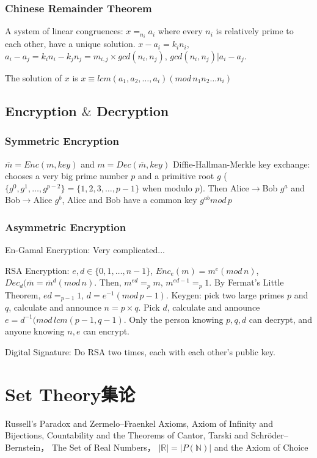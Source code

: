 \documentclass[12pt,a4paper]{ctexrep}
\begin{document}
\subsection{Chinese Remainder Theorem}
A system of linear congruences: $x =_{n_i} a_i$ where every $n_i$ is relatively prime to each other, have a unique solution. $x-a_i = k_i n_i$, $a_i-a_j = k_in_i-k_jn_j = m_{i,j} \times gcd(n_i,n_j)$, $gcd(n_i,n_j)|a_i-a_j$. 

The solution of $x$ is $x\equiv lcm(a_1,a_2,\dots,a_i) (mod\, n_1n_2\dots n_i)$

\section{Encryption $\&$ Decryption}
\subsection{Symmetric Encryption}
$\overline{m} = Enc(m,key)$ and $m = Dec(\overline{m},key)$
Diffie-Hallman-Merkle key exchange: chooses a very big prime number $p$ and a primitive root $g$ ($\{g^0,g^1,\dots, g^{p-2}\} = \{1,2,3,\dots, p-1\}$ when modulo $p$). Then Alice$\rightarrow$Bob $g^a$ and Bob$\rightarrow$Alice $g^b$, Alice and Bob have a common key $g^{ab} mod\, p$

\subsection{Asymmetric Encryption}
En-Gamal Encryption: Very complicated...%

RSA Encryption:
$e,d \in \{0,1,\dots,n-1\}$, $Enc_e(m) = m^e (mod\, n)$, $Dec_d(\overline{m} = \overline{m}^d (mod\, n)$. Then, $m^{ed} =_p m$, $m^{ed-1} =_p 1$. By Fermat's Little Theorem, $ed =_{p-1} 1$, $d = e^{-1} (mod\, p-1)$. Keygen: pick two large primes $p$ and $q$, calculate and announce $n = p \times q$. Pick $d$, calculate and announce $e = d^{-1} (mod\, lcm(p-1,q-1)$. Only the person knowing $p,q,d$ can decrypt, and anyone knowing $n,e$ can encrypt.

Digital Signature:
Do RSA two times, each with each other's public key.

\chapter{Set Theory集论}
Russell's Paradox and Zermelo–Fraenkel Axioms, Axiom of Infinity and Bijections, Countability and the Theorems of Cantor, Tarski and Schr\"oder–Bernstein， The Set of Real Numbers， $|\mathbb{R}|=|P(\mathbb{N})|$ and the Axiom of Choice
\end{document}
